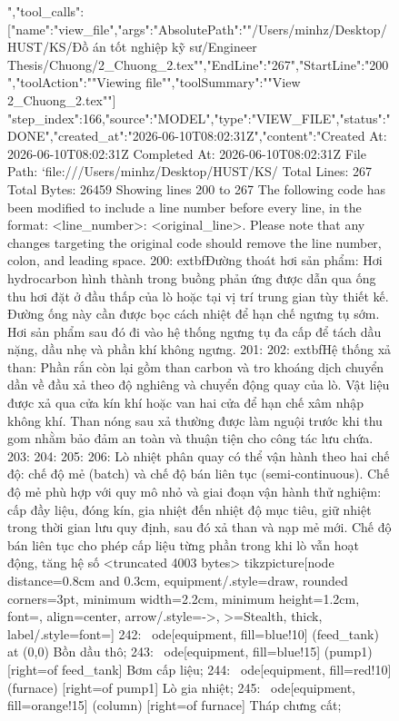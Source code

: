 \begin{figure}[htbp]
{{{{","tool_calls":[{"name":"view_file","args":{"AbsolutePath":""/Users/minhz/Desktop/HUST/KS/Đồ án tốt nghiệp kỹ sư/Engineer Thesis/Chuong/2_Chuong_2.tex"","EndLine":"267","StartLine":"200","toolAction":""Viewing file"","toolSummary":""View 2_Chuong_2.tex""}}]}
{"step_index":166,"source":"MODEL","type":"VIEW_FILE","status":"DONE","created_at":"2026-06-10T08:02:31Z","content":"Created At: 2026-06-10T08:02:31Z
Completed At: 2026-06-10T08:02:31Z
File Path: `file:///Users/minhz/Desktop/HUST/KS/%
Total Lines: 267
Total Bytes: 26459
Showing lines 200 to 267
The following code has been modified to include a line number before every line, in the format: <line_number>: <original_line>. Please note that any changes targeting the original code should remove the line number, colon, and leading space.
200: 	extbf{Đường thoát hơi sản phẩm:} Hơi hydrocarbon hình thành trong buồng phản ứng được dẫn qua ống thu hơi đặt ở đầu thấp của lò hoặc tại vị trí trung gian tùy thiết kế. Đường ống này cần được bọc cách nhiệt để hạn chế ngưng tụ sớm. Hơi sản phẩm sau đó đi vào hệ thống ngưng tụ đa cấp để tách dầu nặng, dầu nhẹ và phần khí không ngưng.
201: 
202: 	extbf{Hệ thống xả than:} Phần rắn còn lại gồm than carbon và tro khoáng dịch chuyển dần về đầu xả theo độ nghiêng và chuyển động quay của lò. Vật liệu được xả qua cửa kín khí hoặc van hai cửa để hạn chế xâm nhập không khí. Than nóng sau xả thường được làm nguội trước khi thu gom nhằm bảo đảm an toàn và thuận tiện cho công tác lưu chứa.
203: 
204: \label{sec:che-do-van-hanh}
205: 
206: Lò nhiệt phân quay có thể vận hành theo hai chế độ: chế độ mẻ (batch) và chế độ bán liên tục (semi-continuous). Chế độ mẻ phù hợp với quy mô nhỏ và giai đoạn vận hành thử nghiệm: cấp đầy liệu, đóng kín, gia nhiệt đến nhiệt độ mục tiêu, giữ nhiệt trong thời gian lưu quy định, sau đó xả than và nạp mẻ mới. Chế độ bán liên tục cho phép cấp liệu từng phần trong khi lò vẫn hoạt động, tăng hệ số 
<truncated 4003 bytes>
tikzpicture}[node distance=0.8cm and 0.3cm, equipment/.style={draw, rounded corners=3pt, minimum width=2.2cm, minimum height=1.2cm, font=\small, align=center}, arrow/.style={->, >=Stealth, thick}, label/.style={font=\footnotesize}]
242: \
ode[equipment, fill=blue!10] (feed_tank) at (0,0) {Bồn dầu thô};
243: \
ode[equipment, fill=blue!15] (pump1) [right=of feed_tank] {Bơm cấp liệu};
244: \
ode[equipment, fill=red!10] (furnace) [right=of pump1] {Lò gia nhiệt};
245: \
ode[equipment, fill=orange!15] (column) [right=of furnace] {Tháp chưng cất};
}}}
\end{figure}
